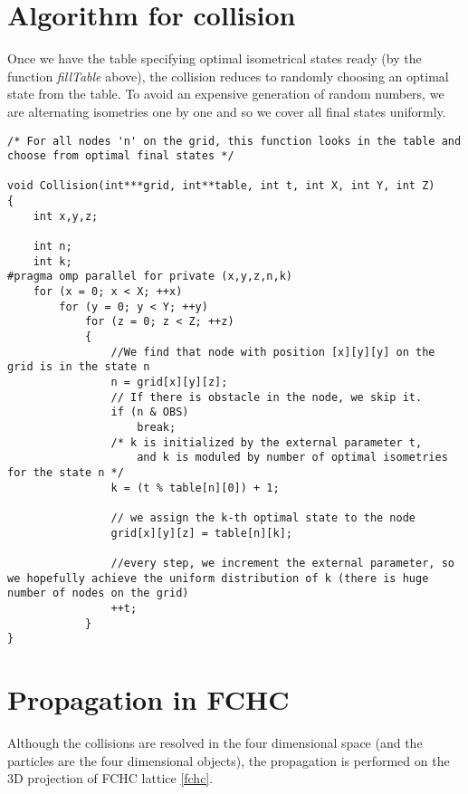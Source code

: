 \section{Algorithm for collision}
Once we have the table specifying optimal isometrical states ready (by the function \textit{fillTable} above), the collision reduces to randomly choosing an optimal state from the table. To avoid an expensive generation of random numbers, we are alternating isometries one by one and so we cover all final states uniformly.

\begin{lstlisting}
/* For all nodes 'n' on the grid, this function looks in the table and choose from optimal final states */

void Collision(int***grid, int**table, int t, int X, int Y, int Z)
{
	int x,y,z;

	int n;
	int k;
#pragma omp parallel for private (x,y,z,n,k)
	for (x = 0; x < X; ++x)
		for (y = 0; y < Y; ++y)
			for (z = 0; z < Z; ++z)
			{
				//We find that node with position [x][y][y] on the grid is in the state n 
				n = grid[x][y][z];
				// If there is obstacle in the node, we skip it.
				if (n & OBS)
					break;
				/* k is initialized by the external parameter t,
				    and k is moduled by number of optimal isometries for the state n */
				k = (t % table[n][0]) + 1;
				
				// we assign the k-th optimal state to the node 
				grid[x][y][z] = table[n][k];
				
				//every step, we increment the external parameter, so we hopefully achieve the uniform distribution of k (there is huge number of nodes on the grid)
				++t;
			}
}
\end{lstlisting}

\section{Propagation in FCHC}
Although the collisions are resolved in the four dimensional space (and the particles are the four dimensional objects), the propagation is performed on the 3D projection of FCHC lattice \ref{fchc}.

